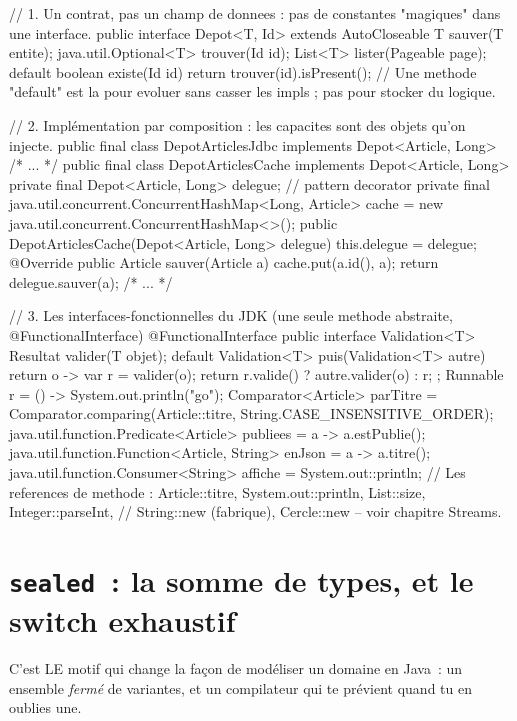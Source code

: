 \begin{codejava}
// 1. Un contrat, pas un champ de donnees : pas de constantes "magiques" dans une interface.
public interface Depot<T, Id> extends AutoCloseable {
    T sauver(T entite);
    java.util.Optional<T> trouver(Id id);
    List<T> lister(Pageable page);
    default boolean existe(Id id) { return trouver(id).isPresent(); }
    // Une methode "default" est la pour evoluer sans casser les impls ; pas pour stocker du logique.
}

// 2. Impl\'ementation par composition : les capacites sont des objets qu'on injecte.
public final class DepotArticlesJdbc implements Depot<Article, Long> { /* ... */ }
public final class DepotArticlesCache implements Depot<Article, Long> {
    private final Depot<Article, Long> delegue;          // pattern decorator
    private final java.util.concurrent.ConcurrentHashMap<Long, Article> cache = new java.util.concurrent.ConcurrentHashMap<>();
    public DepotArticlesCache(Depot<Article, Long> delegue) { this.delegue = delegue; }
    @Override public Article sauver(Article a) { cache.put(a.id(), a); return delegue.sauver(a); }
    /* ... */
}

// 3. Les interfaces-fonctionnelles du JDK (une seule methode abstraite, @FunctionalInterface)
@FunctionalInterface
public interface Validation<T> {
    Resultat valider(T objet);
    default Validation<T> puis(Validation<T> autre) {
        return o -> { var r = valider(o); return r.valide() ? autre.valider(o) : r; };
    }
}
Runnable r = () -> System.out.println("go");
Comparator<Article> parTitre = Comparator.comparing(Article::titre, String.CASE_INSENSITIVE_ORDER);
java.util.function.Predicate<Article> publiees = a -> a.estPublie();
java.util.function.Function<Article, String> enJson = a -> a.titre();
java.util.function.Consumer<String> affiche = System.out::println;
// Les references de methode : Article::titre, System.out::println, List::size, Integer::parseInt,
// String::new (fabrique), Cercle::new -- voir chapitre Streams.
\end{codejava}

\section{\texttt{sealed}~: la somme de types, et le switch exhaustif}

C'est LE motif qui change la fa\c{c}on de mod\'eliser un domaine en Java~: un ensemble \emph{ferm\'e}
de variantes, et un compilateur qui te pr\'evient quand tu en oublies une.

